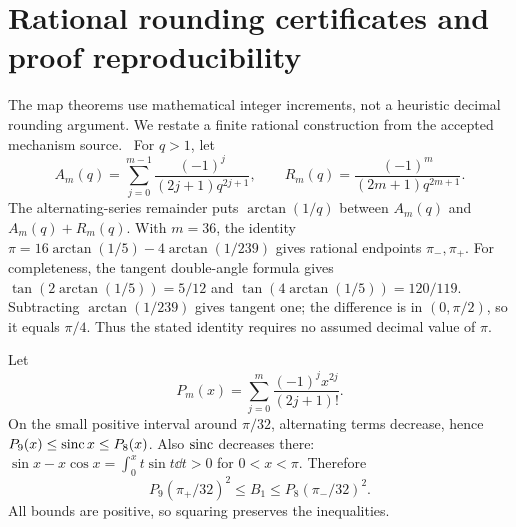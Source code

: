 \appendix
\section{Rational rounding certificates and proof reproducibility}\label{app:rational}
The map theorems use mathematical integer increments, not a heuristic decimal rounding argument. We restate a finite rational construction from the accepted mechanism source.~\cite{Mechanism} For $q>1$, let
\[
 A_m(q)=\sum_{j=0}^{m-1}\frac{(-1)^j}{(2j+1)q^{2j+1}},\qquad
 R_m(q)=\frac{(-1)^m}{(2m+1)q^{2m+1}}.
\]
The alternating-series remainder puts $\arctan(1/q)$ between $A_m(q)$ and $A_m(q)+R_m(q)$. With $m=36$, the identity
$\pi=16\arctan(1/5)-4\arctan(1/239)$ gives rational endpoints $\pi_-,\pi_+$. For completeness, the tangent double-angle formula gives $\tan(2\arctan(1/5))=5/12$ and $\tan(4\arctan(1/5))=120/119$. Subtracting $\arctan(1/239)$ gives tangent one; the difference is in $(0,\pi/2)$, so it equals $\pi/4$. Thus the stated identity requires no assumed decimal value of $\pi$.

Let
\[
 P_m(x)=\sum_{j=0}^{m}\frac{(-1)^j x^{2j}}{(2j+1)!}.
\]
On the small positive interval around $\pi/32$, alternating terms decrease, hence $P_9(x)\le\operatorname{sinc} x\le P_8(x)$. Also $\operatorname{sinc}$ decreases there: $\sin x-x\cos x=\int_0^x t\sin t\dd t>0$ for $0<x<\pi$. Therefore
\begin{equation}\label{eq:rationalB}
 P_9(\pi_+/32)^2\le B_1\le P_8(\pi_-/32)^2 .
\end{equation}
All bounds are positive, so squaring preserves the inequalities.


